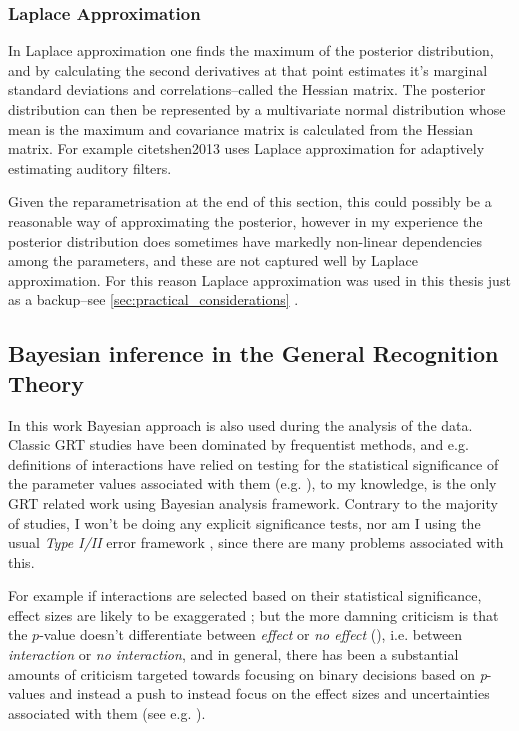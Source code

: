 \documentclass{article}\usepackage{knitr}
\begin{document}
\subsubsection{Laplace Approximation}

In Laplace approximation one finds the maximum of the posterior distribution, and by calculating the second derivatives at that point estimates it's marginal standard deviations and correlations--called the Hessian matrix. The posterior distribution can then be represented by a multivariate normal distribution whose mean is the maximum and covariance matrix is calculated from the Hessian matrix. For example citet{shen2013} uses Laplace approximation for adaptively estimating auditory filters.

Given the reparametrisation at the end of this section, this could possibly be a reasonable way of approximating the  posterior, however in my experience the posterior distribution does sometimes have markedly non-linear dependencies among the parameters, and these are not captured well by Laplace approximation. For this reason Laplace approximation was used in this thesis just as a backup--see \ref{sec:practical_considerations} \textit{}.

\subsection{Bayesian inference in the General Recognition Theory}

In this work Bayesian approach is also used during the analysis of the data. Classic GRT studies have been dominated by frequentist methods, and e.g. definitions of interactions have relied on testing for the statistical significance of the parameter values associated with them (e.g. \cite{ashby2015, wickens1992}), to my knowledge, \cite{silbert2010} is the only GRT related work using Bayesian analysis framework. Contrary to the majority of studies, I won't be doing any explicit significance tests, nor am I using the usual \textit{Type I/II} error framework \citep[pp. 470 - 471]{christensen1997}, since there are many problems associated with this.

For example if interactions are selected based on their statistical significance, effect sizes are likely to be exaggerated \citep{gelman2018}; but the more damning criticism is that the $p$-value doesn't differentiate between \textit{effect} or \textit{no effect} (\cite{greenland2016}), i.e. between \textit{interaction} or \textit{no interaction}, and in general, there has been a substantial amounts of criticism targeted towards focusing on binary decisions based on \textit{p}-values and instead a push to instead focus on the effect sizes and uncertainties associated with them (see e.g. \citet{kline2004, greenland2016, steiger1997}). 
\end{document}
